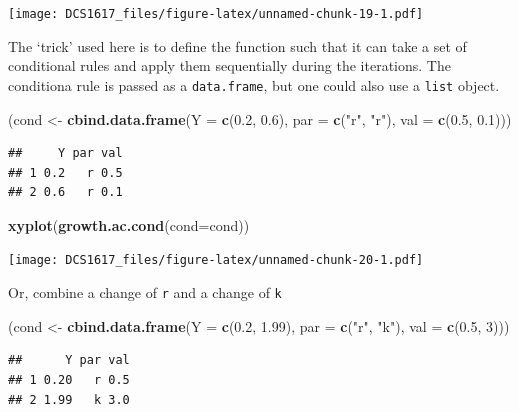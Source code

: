 \documentclass[]{book}
\newenvironment{Shaded}{\begin{snugshade}}{\end{snugshade}}
\newcommand{\KeywordTok}[1]{\textcolor[rgb]{0.13,0.29,0.53}{\textbf{{#1}}}}
\newcommand{\DataTypeTok}[1]{\textcolor[rgb]{0.13,0.29,0.53}{{#1}}}
\newcommand{\DecValTok}[1]{\textcolor[rgb]{0.00,0.00,0.81}{{#1}}}
\newcommand{\FloatTok}[1]{\textcolor[rgb]{0.00,0.00,0.81}{{#1}}}
\newcommand{\StringTok}[1]{\textcolor[rgb]{0.31,0.60,0.02}{{#1}}}
\newcommand{\NormalTok}[1]{{#1}}
\begin{document}
\texttt{[image: DCS1617\_files/figure-latex/unnamed-chunk-19-1.pdf]}

The `trick' used here is to define the function such that it can take a
set of conditional rules and apply them sequentially during the
iterations. The conditiona rule is passed as a \texttt{data.frame}, but
one could also use a \texttt{list} object.

\begin{Shaded}
\begin{Highlighting}[]
\NormalTok{(cond <-}\StringTok{ }\KeywordTok{cbind.data.frame}\NormalTok{(}\DataTypeTok{Y =} \KeywordTok{c}\NormalTok{(}\FloatTok{0.2}\NormalTok{, }\FloatTok{0.6}\NormalTok{), }\DataTypeTok{par =} \KeywordTok{c}\NormalTok{(}\StringTok{"r"}\NormalTok{, }\StringTok{"r"}\NormalTok{), }\DataTypeTok{val =} \KeywordTok{c}\NormalTok{(}\FloatTok{0.5}\NormalTok{, }\FloatTok{0.1}\NormalTok{)))}
\end{Highlighting}
\end{Shaded}

\begin{verbatim}
##     Y par val
## 1 0.2   r 0.5
## 2 0.6   r 0.1
\end{verbatim}

\begin{Shaded}
\begin{Highlighting}[]
\KeywordTok{xyplot}\NormalTok{(}\KeywordTok{growth.ac.cond}\NormalTok{(}\DataTypeTok{cond=}\NormalTok{cond))}
\end{Highlighting}
\end{Shaded}

\texttt{[image: DCS1617\_files/figure-latex/unnamed-chunk-20-1.pdf]}

Or, combine a change of \texttt{r} and a change of \texttt{k}

\begin{Shaded}
\begin{Highlighting}[]
\NormalTok{(cond <-}\StringTok{ }\KeywordTok{cbind.data.frame}\NormalTok{(}\DataTypeTok{Y =} \KeywordTok{c}\NormalTok{(}\FloatTok{0.2}\NormalTok{, }\FloatTok{1.99}\NormalTok{), }\DataTypeTok{par =} \KeywordTok{c}\NormalTok{(}\StringTok{"r"}\NormalTok{, }\StringTok{"k"}\NormalTok{), }\DataTypeTok{val =} \KeywordTok{c}\NormalTok{(}\FloatTok{0.5}\NormalTok{, }\DecValTok{3}\NormalTok{)))}
\end{Highlighting}
\end{Shaded}

\begin{verbatim}
##      Y par val
## 1 0.20   r 0.5
## 2 1.99   k 3.0
\end{verbatim}
\end{document}

